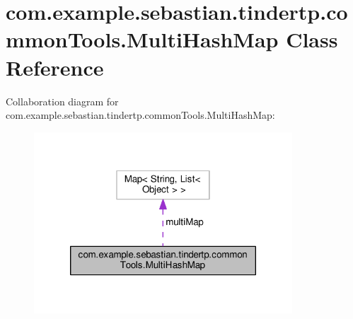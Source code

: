 \hypertarget{classcom_1_1example_1_1sebastian_1_1tindertp_1_1commonTools_1_1MultiHashMap}{}\section{com.\+example.\+sebastian.\+tindertp.\+common\+Tools.\+Multi\+Hash\+Map Class Reference}
\label{classcom_1_1example_1_1sebastian_1_1tindertp_1_1commonTools_1_1MultiHashMap}


Collaboration diagram for com.\+example.\+sebastian.\+tindertp.\+common\+Tools.\+Multi\+Hash\+Map\+:\nopagebreak
\begin{figure}[H]
\begin{center}
\leavevmode
\includegraphics[width=274pt]{classcom_1_1example_1_1sebastian_1_1tindertp_1_1commonTools_1_1MultiHashMap__coll__graph}
\end{center}
\end{figure}
